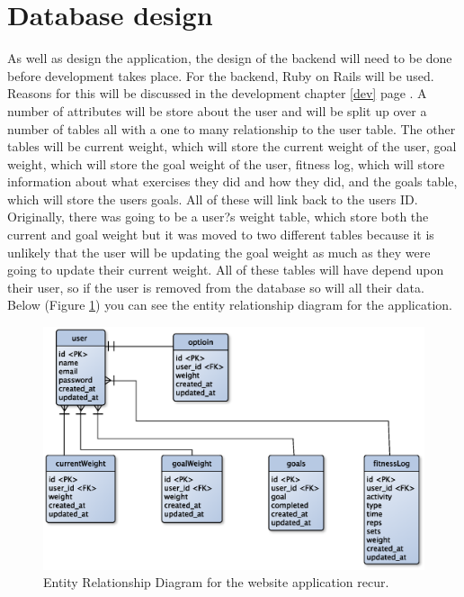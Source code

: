 \section{Database design}
As well as design the application, the design of the backend will need to be done before development takes place. For the backend, Ruby on Rails \citep{rails:2013} will be used. Reasons for this will be discussed in the development chapter \ref{dev} page \pageref{dev}. A number of attributes will be store about the user and will be split up over a number of tables all with a one to many relationship to the user table. The other tables will be current weight, which will store the current weight of the user, goal weight, which will store the goal weight of the user, fitness log, which will store information about what exercises they did and how they did, and the goals table, which will store the users goals. All of these will link back to the users ID. Originally, there was going to be a user?s weight table, which store both the current and goal weight but it was moved to two different tables because it is unlikely that the user will be updating the goal weight as much as they were going to update their current weight. All of these tables will have depend upon their user, so if the user is removed from the database so will all their data. Below (Figure \ref{fig:erd}) you can see the entity relationship diagram for the application.

\begin{figure}[!ht]
\centering
\includegraphics[scale=0.5]{chapters/figs/erd}
\caption{Entity Relationship Diagram for the website application recur.}
\label{fig:erd}
\end{figure}